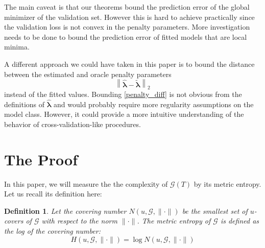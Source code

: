 \documentclass[12pt]{article}
\newtheorem{definition}{Definition}
\begin{document}
The main caveat is that our theorems bound the prediction error of the global minimizer of the validation set. However this is hard to achieve practically since the validation loss is not convex in the penalty parameters. More investigation needs to be done to bound the prediction error of fitted models that are local minima.

A different approach we could have taken in this paper is to bound the distance between the estimated and oracle penalty parameters
\begin{equation}
\label{penalty_diff}
\left \| \hat{\boldsymbol \lambda} - \tilde{\boldsymbol \lambda} \right \|_2
\end{equation}
instead of the fitted values. Bounding \ref{penalty_diff} is not obvious from the definitions of $\hat{\boldsymbol{\lambda}}$ and would probably require more regularity assumptions on the model class. However, it could provide a more intuitive understanding of the behavior of cross-validation-like procedures.

\section{The Proof} \label{sec:proofs}

In this paper, we will measure the the complexity of $\mathcal{G}(T)$ by its metric entropy. Let us recall its definition here:

\begin{definition}
Let the covering number $N(u, \mathcal{G}, \| \cdot \|)$ be the smallest set of $u$-covers of $\mathcal{G}$ with respect to the norm $\| \cdot \|$. The metric entropy of $\mathcal{G}$ is defined as the log of the covering number:
\begin{equation}
H (u, \mathcal{G}, \| \cdot \| ) = \log N(u, \mathcal{G}, \| \cdot \|)
\end{equation}
\end{definition}
\end{document}

